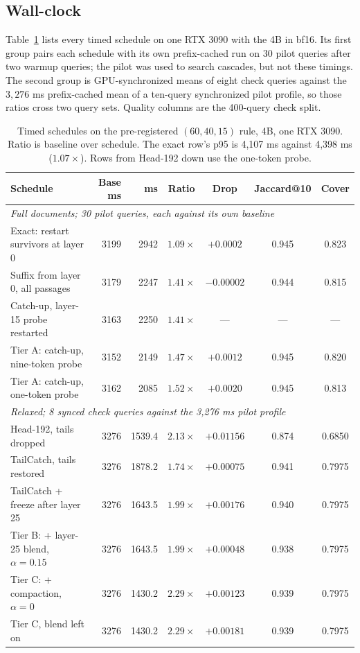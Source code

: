 \documentclass[11pt, a4paper]{article}
\begin{document}
\subsection{Wall-clock}
\label{sec:clock}

Table~\ref{tab:clock} lists every timed schedule on one RTX 3090 with the 4B in bf16.
Its first group pairs each schedule with its own prefix-cached run on 30 pilot queries after two warmup queries; the pilot was used to search cascades, but not these timings.
The second group is GPU-synchronized means of eight check queries against the $3{,}276$ ms prefix-cached mean of a ten-query synchronized pilot profile, so those ratios cross two query sets.
Quality columns are the 400-query check split.

\begin{table}[t]
\centering
\small
\caption{Timed schedules on the pre-registered $(60, 40, 15)$ rule, 4B, one RTX 3090. Ratio is baseline over schedule. The exact row's p95 is 4,107 ms against 4,398 ms ($1.07\times$). Rows from Head-192 down use the one-token probe.}
\label{tab:clock}
\setlength{\tabcolsep}{4pt}
\begin{tabular}{lrrcccc}
\toprule
Schedule & Base ms & ms & Ratio & Drop & Jaccard@10 & Cover \\
\midrule
\multicolumn{7}{l}{\emph{Full documents; 30 pilot queries, each against its own baseline}} \\
Exact: restart survivors at layer 0 & 3199 & 2942 & $1.09\times$ & $+0.0002$ & 0.945 & 0.823 \\
Suffix from layer 0, all passages & 3179 & 2247 & $1.41\times$ & $-0.00002$ & 0.944 & 0.815 \\
Catch-up, layer-15 probe restarted & 3163 & 2250 & $1.41\times$ & --- & --- & --- \\
Tier A: catch-up, nine-token probe & 3152 & 2149 & $1.47\times$ & $+0.0012$ & 0.945 & 0.820 \\
Tier A: catch-up, one-token probe & 3162 & 2085 & $1.52\times$ & $+0.0020$ & 0.945 & 0.813 \\
\midrule
\multicolumn{7}{l}{\emph{Relaxed; 8 synced check queries against the 3,276 ms pilot profile}} \\
Head-192, tails dropped & 3276 & 1539.4 & $2.13\times$ & $+0.01156$ & 0.874 & 0.6850 \\
TailCatch, tails restored & 3276 & 1878.2 & $1.74\times$ & $+0.00075$ & 0.941 & 0.7975 \\
TailCatch + freeze after layer 25 & 3276 & 1643.5 & $1.99\times$ & $+0.00176$ & 0.940 & 0.7975 \\
Tier B: + layer-25 blend, $\alpha = 0.15$ & 3276 & 1643.5 & $1.99\times$ & $+0.00048$ & 0.938 & 0.7975 \\
Tier C: + compaction, $\alpha = 0$ & 3276 & 1430.2 & $2.29\times$ & $+0.00123$ & 0.939 & 0.7975 \\
Tier C, blend left on & 3276 & 1430.2 & $2.29\times$ & $+0.00181$ & 0.939 & 0.7975 \\
\bottomrule
\end{tabular}
\end{table}
\end{document}
